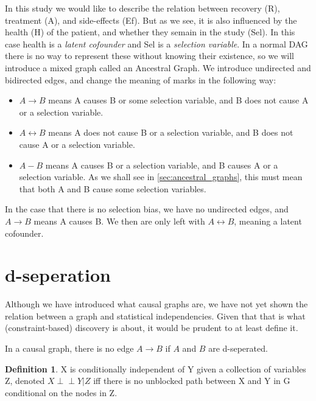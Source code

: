 \documentclass[11pt,a4paper]{report}
\theoremstyle{definition}
\newtheorem{defn}{Definition}[section]
\def\ci{\perp\!\!\!\perp}
\begin{document}
In this study we would like to describe the relation between recovery (R),
treatment (A), and side-effects (Ef). But as we see, it is also influenced
by the health (H) of the patient, and whether they semain in the study
(Sel). In this case health is a \emph{latent cofounder} and Sel is a
\emph{selection variable}. In a normal DAG there is no way to represent
these without knowing their existence, so we will introduce a mixed graph
called an Ancestral Graph. We introduce undirected and bidirected edges,
and change the meaning of marks in the following way:

\begin{itemize}
  \item $A \rightarrow B$ means A causes B or some selection variable, and B
    does not cause A or a selection variable.

  \item $A \leftrightarrow B$ means A does not cause B or a selection
    variable, and B does not cause A or a selection variable.

  \item $A - B$ means A causes B or a selection variable, and B causes A
    or a selection variable. As we shall see in
    \ref{sec:ancestral_graphs}, this must mean that both A and B cause
    some selection variables.
\end{itemize}

In the case that there is no selection bias, we have no undirected edges,
and $A \rightarrow B$ means A causes B. We then are only left with $A
\leftrightarrow B$, meaning a latent cofounder.

\section{d-seperation}
Although we have introduced what causal graphs are, we have not yet shown
the relation between a graph and statistical independencies. Given that
that is what (constraint-based) discovery is about, it would be prudent to
at least define it.

In a causal graph, there is no edge $A \rightarrow B$ if $A$ and $B$ are
d-seperated.

\begin{defn}
  X is conditionally independent of Y given a collection of variables Z,
  denoted $X \ci Y | Z$ iff there is no unblocked path between X and Y in
  G conditional on the nodes in Z.
\end{defn}
\end{document}
